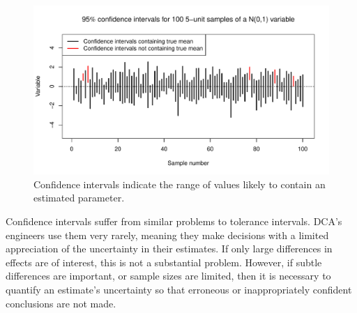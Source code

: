 \documentclass[11pt,a4paper,article]{memoir} %
\begin{document}
\begin{figure}[H]
\includegraphics[width=\textwidth]{confidence_intervals.pdf}
\caption{Confidence intervals indicate the range of values likely to contain an estimated parameter.}
\label{fig:confidence_intervals}
\end{figure}
Confidence intervals suffer from similar problems to tolerance intervals. DCA's engineers use them very rarely, meaning they make decisions with a limited appreciation of the uncertainty in their estimates. If only large differences in effects are of interest, this is not a substantial problem. However, if subtle differences are important, or sample sizes are limited, then it is necessary to quantify an estimate's uncertainty so that erroneous or inappropriately confident conclusions are not made.
\end{document}
